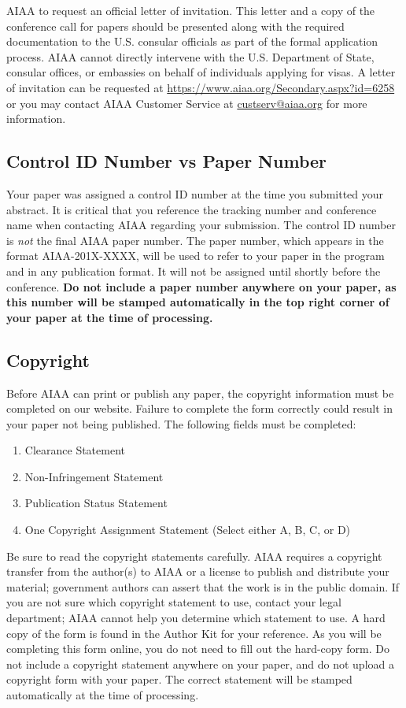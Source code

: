 AIAA to request an official letter of invitation. This letter and a copy of the conference call for papers should be presented along with the required documentation to the U.S. consular officials as part of the formal application process.  AIAA cannot directly intervene with the U.S. Department of State, consular offices, or embassies on behalf of individuals applying for visas. A letter of invitation can be requested at \url{https://www.aiaa.org/Secondary.aspx?id=6258} or you may contact AIAA Customer Service at \url{custserv@aiaa.org} for more information.

\subsection{Control ID Number vs Paper Number}

Your paper was assigned a control ID number at the time you submitted your abstract. It is critical that you reference the tracking number and conference name when contacting AIAA regarding your submission. The control ID number is \emph{not} the final AIAA paper number. The paper number, which appears in the format AIAA-201X-XXXX, will be used to refer to your paper in the program and in any publication format. It will not be assigned until shortly before the conference. \textbf{Do not include a paper number anywhere on your paper, as this number will be stamped automatically in the top right corner of your paper at the time of processing.}

\subsection{Copyright}

Before AIAA can print or publish any paper, the copyright information must be completed on our website. Failure to complete the form correctly could result in your paper not being published. The following fields must be completed:

\begin{enumerate}
\item Clearance Statement
\item Non-Infringement Statement
\item Publication Status Statement
\item One Copyright Assignment Statement (Select either A, B, C, or D)
\end{enumerate}

Be sure to read the copyright statements carefully. AIAA requires a copyright transfer from the author(s) to AIAA or a license to publish and distribute your material; government authors can assert that the work is in the public domain. If you are not sure which copyright statement to use, contact your legal department; AIAA cannot help you determine which statement to use. A hard copy of the form is found in the Author Kit for your reference. As you will be completing this form online, you do not need to fill out the hard-copy form. Do not include a copyright statement anywhere on your paper, and do not upload a copyright form with your paper. The correct statement will be stamped automatically at the time of processing.


